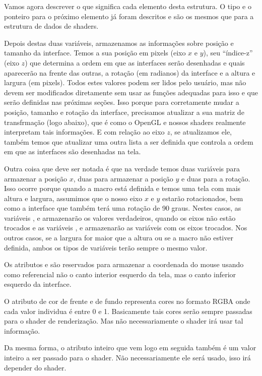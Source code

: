 Vamos agora descrever o que significa cada elemento desta estrutura. O
tipo e o ponteiro para o próximo elemento já foram descritos e são os
mesmos que para a estrutura de dados de shaders.

Depois destas duas variáveis, armazenamos as informações sobre posição
e tamanho da interface. Temos a sua posição em pixels (eixo $x$ e
$y$), seu ``índice-z'' (eixo $z$) que determina a ordem em que as
interfaces serão desenhadas e quais aparecerão na frente das outras, a
rotação (em radianos) da interface e a altura e largura (em
pixels). Todos estes valores podem ser lidos pelo usuário, mas não
devem ser modificados diretamente sem usar as funções adequadas para
isso e que serão definidas nas próximas seções. Isso porque para
corretamente mudar a posição, tamanho e rotação da interface,
precisamos atualizar a sua matriz de transfrmação (logo abaixo), que é
como o OpenGL e nossos shaders realmente interpretam tais
informações. E com relação ao eixo $z$, se atualizamos ele, também
temos que atualizar uma outra lista a ser definida que controla a
ordem em que as interfaces são desenhadas na tela.

Outra coisa que deve ser notada é que na verdade temos duas variáveis
para armazenar a posição $x$, duas para armazenar a posição $y$ e duas
para a rotação. Isso ocorre porque quando a
macro  está definida e temos uma tela
com mais altura e largura, assumimos que o nosso eixo $x$ e $y$
estarão rotacionados, bem como a interface que também terá uma rotação
de 90 graus. Nestes casos, as
variáveis ,  e 
armazenarão os valores verdadeiros, quando os eixos não estão trocados
e as variáveis ,  e 
armazenarão as variáveis com os eixos trocados. Nos outros casos, se a
largura for maior que a altura ou se a macro não estiver definida,
ambos os tipos de variáveis terão sempre o mesmo valor.

Os atributos  e  são
reservados para armazenar a coordenada do mouse usando como
referencial não o canto interior esquerdo da tela, mas o canto
inferior esquerdo da interface.

O atributo de cor de frente e de fundo representa cores no formato
RGBA onde cada valor individua é entre 0 e 1. Basicamente tais cores
serão sempre passadas para o shader de renderização. Mas não
necessariamente o shader irá usar tal informação.

Da mesma forma, o atributo inteiro que vem logo em seguida também é um
valor inteiro a ser passado para o shader. Não necessariamente ele
será usado, isso irá depender do shader.

